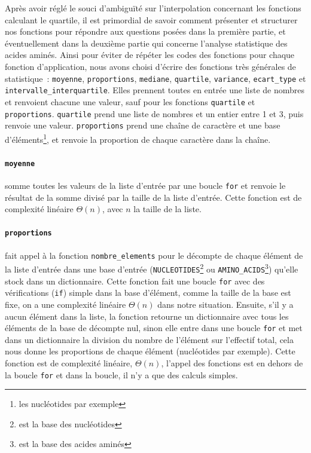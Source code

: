 \documentclass[12pt]{article}
\begin{document}
Après avoir réglé le souci d'ambiguïté sur l'interpolation concernant les fonctions calculant le quartile, il est primordial de savoir comment présenter et structurer nos fonctions pour répondre aux questions posées dans la première partie, et éventuellement dans la deuxième partie qui concerne l'analyse statistique des acides aminés. Ainsi pour éviter de répéter les codes des fonctions pour chaque fonction d'application, nous avons choisi d'écrire des fonctions très générales de statistique~: \texttt{moyenne}, \texttt{proportions}, \texttt{mediane}, \texttt{quartile}, \texttt{variance}, \texttt{ecart\_type} et \texttt{intervalle\_interquartile}. Elles prennent toutes en entrée une liste de nombres et renvoient chacune une valeur, sauf pour les fonctions \texttt{quartile} et \texttt{proportions}. \texttt{quartile} prend une liste de nombres et un entier entre 1 et 3, puis renvoie une valeur. \texttt{proportions} prend une chaîne de caractère et une base d'éléments\footnote{les nucléotides par exemple}, et renvoie la proportion de chaque caractère dans la chaîne.
\paragraph{\texttt{moyenne}} somme toutes les valeurs de la liste d'entrée par une boucle \texttt{for} et renvoie le résultat de la somme divisé par la taille de la liste d'entrée. Cette fonction est de complexité linéaire $\Theta(n)$, avec $n$ la taille de la liste.
\paragraph{\texttt{proportions}} fait appel à la fonction \texttt{nombre\_elements} pour le décompte de chaque élément de la liste d'entrée dans une base d'entrée (\texttt{NUCLEOTIDES}\footnote{est la base des nucléotides} ou \texttt{AMINO\_ACIDS}\footnote{est la base des acides aminés}) qu'elle stock dans un dictionnaire. Cette fonction fait une boucle \texttt{for} avec des vérifications (\texttt{if}) simple dans la base d'élément, comme la taille de la base est fixe, on a une complexité linéaire $\Theta(n)$ dans notre situation. Ensuite, s'il y a aucun élément dans la liste, la fonction retourne un dictionnaire avec tous les éléments de la base de décompte nul, sinon elle entre dans une boucle \texttt{for} et met dans un dictionnaire la division du nombre de l'élément sur l'effectif total, cela nous donne les proportions de chaque élément (nucléotides par exemple). Cette fonction est de complexité linéaire, $\Theta(n)$, l'appel des fonctions est en dehors de la boucle \texttt{for} et dans la boucle, il n'y a que des calculs simples.
\end{document}
